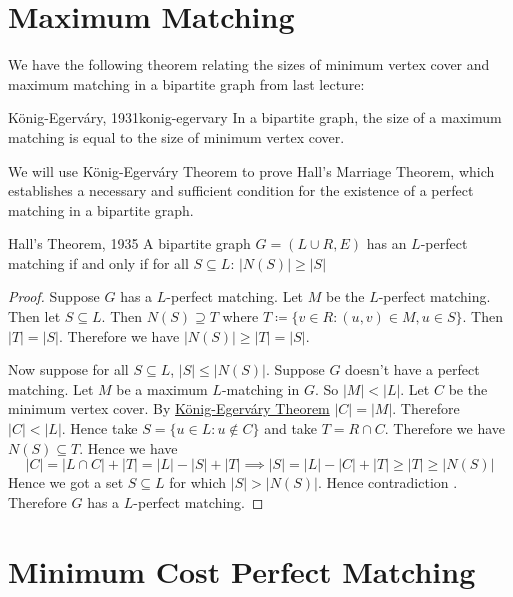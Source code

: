 \documentclass[twoside]{article}
\begin{document}
\section{Maximum Matching}
We have the following theorem relating the sizes of minimum vertex cover and maximum matching in a bipartite graph from last lecture:
\begin{theorem}{K\"{o}nig-Egerv\'{a}ry, 1931}{konig-egervary}
	In a bipartite graph, the size of a maximum matching is equal to the size of minimum vertex cover.
\end{theorem}

We will use K\"{o}nig-Egerv\'{a}ry Theorem to prove Hall's Marriage Theorem, which establishes a necessary and sufficient condition for the existence of a perfect matching in a bipartite graph.
\begin{theorem}{Hall's Theorem, 1935}{}
	A bipartite graph $G=(L\cup R,E)$ has an $L$-perfect matching if and only if for all $S\subseteq L$: $|N(S)|\geq |S|$
\end{theorem}
\begin{proof}
	Suppose $G$ has a $L$-perfect matching. Let $M$ be the $L$-perfect matching. Then let $S\subseteq L$. Then $N(S)\supseteq T$ where $T\coloneqq\{v\in R\colon (u,v)\in M, u\in S\}$. Then $|T|=|S|$. Therefore we have $|N(S)|\geq |T|=|S|$. 
	
	Now suppose for all $S\subseteq L$, $|S|\leq |N(S)|$. Suppose $G$ doesn't have a perfect matching. Let $M$ be a maximum $L$-matching in $G$. So $|M|<|L|$. Let $C$ be the minimum vertex cover. By \hyperref[th:konig-egervary]{K\"{o}nig-Egerv\'{a}ry Theorem} $|C|=|M|$. Therefore $|C|<|L|$. Hence take $S=\{u\in L\colon u\notin C\}$ and take $T=R\cap C$. Therefore we have $N(S)\subseteq T$. Hence we have $$|C|=|L\cap C|+|T|=|L|-|S|+|T|\implies |S|=|L|-|C|+|T|\geq |T|\geq |N(S)|$$Hence we got a set $S\subseteq L$ for which $|S|> |N(S)|$. Hence contradiction \ctr. Therefore $G$ has a $L$-perfect matching.
\end{proof}
\section{Minimum Cost Perfect Matching}
\begin{algoprob}
\end{algoprob}
\end{document}
